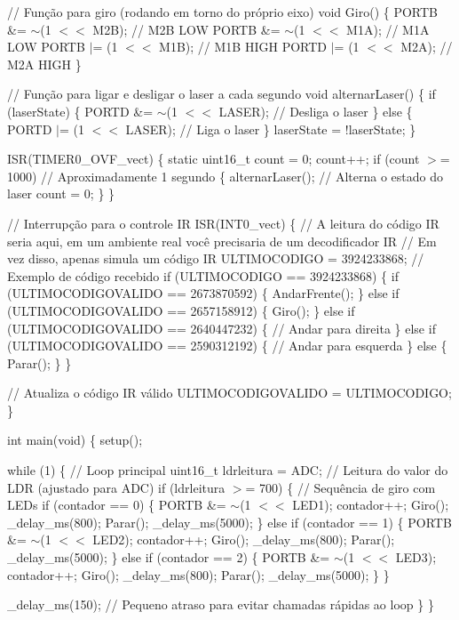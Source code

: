 // Função para giro (rodando em torno do próprio eixo) void Giro() \{ PORTB \&= \texorpdfstring{$\sim$}{\string~}(1 \texorpdfstring{$<$}{<}\texorpdfstring{$<$}{<} M2B); // M2B LOW PORTB \&= \texorpdfstring{$\sim$}{\string~}(1 \texorpdfstring{$<$}{<}\texorpdfstring{$<$}{<} M1A); // M1A LOW PORTB \texorpdfstring{$\vert$}{|}= (1 \texorpdfstring{$<$}{<}\texorpdfstring{$<$}{<} M1B); // M1B HIGH PORTD \texorpdfstring{$\vert$}{|}= (1 \texorpdfstring{$<$}{<}\texorpdfstring{$<$}{<} M2A); // M2A HIGH \}

// Função para ligar e desligar o laser a cada segundo void alternar\+Laser() \{ if (laser\+State) \{ PORTD \&= \texorpdfstring{$\sim$}{\string~}(1 \texorpdfstring{$<$}{<}\texorpdfstring{$<$}{<} LASER); // Desliga o laser \} else \{ PORTD \texorpdfstring{$\vert$}{|}= (1 \texorpdfstring{$<$}{<}\texorpdfstring{$<$}{<} LASER); // Liga o laser \} laser\+State = !laser\+State; \}

ISR(\+TIMER0\+\_\+\+OVF\+\_\+vect) \{ static uint16\+\_\+t count = 0; count++; if (count \texorpdfstring{$>$}{>}= 1000) // Aproximadamente 1 segundo \{ alternar\+Laser(); // Alterna o estado do laser count = 0; \} \}

// Interrupção para o controle IR ISR(\+INT0\+\_\+vect) \{ // A leitura do código IR seria aqui, em um ambiente real você precisaria de um decodificador IR // Em vez disso, apenas simula um código IR ULTIMOCODIGO = 3924233868; // Exemplo de código recebido if (ULTIMOCODIGO == 3924233868) \{ if (ULTIMOCODIGOVALIDO == 2673870592) \{ Andar\+Frente(); \} else if (ULTIMOCODIGOVALIDO == 2657158912) \{ Giro(); \} else if (ULTIMOCODIGOVALIDO == 2640447232) \{ // Andar para direita \} else if (ULTIMOCODIGOVALIDO == 2590312192) \{ // Andar para esquerda \} else \{ Parar(); \} \}

// Atualiza o código IR válido ULTIMOCODIGOVALIDO = ULTIMOCODIGO; \}

int main(void) \{ setup();

while (1) \{ // Loop principal uint16\+\_\+t ldrleitura = ADC; // Leitura do valor do LDR (ajustado para ADC) if (ldrleitura \texorpdfstring{$>$}{>}= 700) \{ // Sequência de giro com LEDs if (contador == 0) \{ PORTB \&= \texorpdfstring{$\sim$}{\string~}(1 \texorpdfstring{$<$}{<}\texorpdfstring{$<$}{<} LED1); contador++; Giro(); \+\_\+delay\+\_\+ms(800); Parar(); \+\_\+delay\+\_\+ms(5000); \} else if (contador == 1) \{ PORTB \&= \texorpdfstring{$\sim$}{\string~}(1 \texorpdfstring{$<$}{<}\texorpdfstring{$<$}{<} LED2); contador++; Giro(); \+\_\+delay\+\_\+ms(800); Parar(); \+\_\+delay\+\_\+ms(5000); \} else if (contador == 2) \{ PORTB \&= \texorpdfstring{$\sim$}{\string~}(1 \texorpdfstring{$<$}{<}\texorpdfstring{$<$}{<} LED3); contador++; Giro(); \+\_\+delay\+\_\+ms(800); Parar(); \+\_\+delay\+\_\+ms(5000); \} \}

\+\_\+delay\+\_\+ms(150); // Pequeno atraso para evitar chamadas rápidas ao loop \} \} 